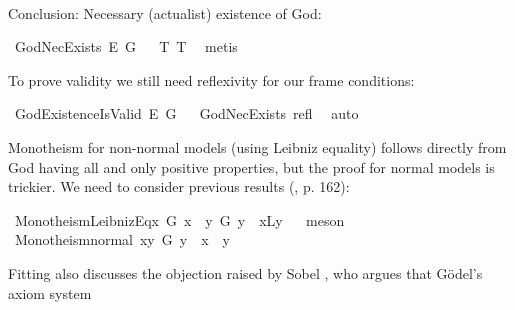 \begin{isabellebody}
\ %
%
\isamarkupfalse%
\ {\isacharminus}\ %
%
%
%
%
\begin{isamarkuptext}%
Conclusion: Necessary (actualist) existence of God:%
\end{isamarkuptext}\isamarkuptrue%
\isamarkupfalse%
\ GodNecExists{\isacharcolon}\ {\isachardoublequoteopen}{\isasymlfloor}\isactrlbold {\isasymbox}\isactrlbold {\isasymexists}\isactrlsup E\ G{\isasymrfloor}{\isachardoublequoteclose}%
\ %
%
\isamarkupfalse%
\ T{}\ T{}\ \isamarkupfalse%
\ metis%
%
%
%
\begin{isamarkuptext}%
To prove validity we still need reflexivity for our frame conditions:%
\end{isamarkuptext}\isamarkuptrue%
\isamarkupfalse%
\ GodExistenceIsValid{\isacharcolon}\ {\isachardoublequoteopen}{\isasymlfloor}\isactrlbold {\isasymexists}\isactrlsup E\ G{\isasymrfloor}{\isachardoublequoteclose}%
\ %
%
\isamarkupfalse%
\ GodNecExists\ refl\ \isamarkupfalse%
\ auto%
%
%
%
\begin{isamarkuptext}%
Monotheism for non-normal models (using Leibniz equality) follows directly from God having all
and only positive properties, but the proof for normal models is trickier. We need to consider previous results
 (\cite{Fitting}, p. 162):%
\end{isamarkuptext}\isamarkuptrue%
\isamarkupfalse%
\ Monotheism{\isacharunderscore}LeibnizEq{\isacharcolon}{\isachardoublequoteopen}{\isasymlfloor}\isactrlbold {\isasymforall}x{\isachardot}\ G{\isacharasterisk}\ x\ \isactrlbold {\isasymrightarrow}\ {\isacharparenleft}\isactrlbold {\isasymforall}y{\isachardot}\ G{\isacharasterisk}\ y\ \isactrlbold {\isasymrightarrow}\ x\isactrlbold {\isasymapprox}\isactrlsup Ly{\isacharparenright}{\isasymrfloor}{\isachardoublequoteclose}%
\ %
%
\isamarkupfalse%
\ meson%
%
%
\isanewline
{}\isamarkupfalse%
\ Monotheism{\isacharunderscore}normal{\isacharcolon}\ {\isachardoublequoteopen}{\isasymlfloor}\isactrlbold {\isasymexists}x{\isachardot}\isactrlbold {\isasymforall}y{\isachardot}\ G\ y\ \isactrlbold {\isasymleftrightarrow}\ x\ \isactrlbold {\isasymapprox}\ y{\isasymrfloor}{\isachardoublequoteclose}%
\ %
%
\isamarkupfalse%
\ {\isacharminus}\ %
%
%
%
%
%
%
%
%
%
%
\begin{isamarkuptext}%
Fitting \cite{Fitting} also discusses the objection raised by Sobel \cite{sobel2004logic}, who argues that G\"odel's axiom system

\end{isamarkuptext}
\end{isabellebody}
